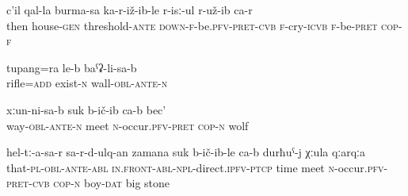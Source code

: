 \begin{exe} 
	\ex	\label{Then she sat down at the entrance of the house and was crying}
	\gll	c'il	qal-la	burma-sa	ka-r-iž-ib-le	r-isː-ul	r-už-ib ca-r\\
		then	house-\textsc{gen}	threshold-\textsc{ante}	\textsc{down}-\textsc{f}-be.\textsc{pfv}-\textsc{pret}-\textsc{cvb}	\textsc{f}-cry-\textsc{icvb}	\textsc{f}-be-\textsc{pret} \textsc{cop-f}\\
	\glt	{}
	
	
	\ex	\label{There is also a rifle (hanging) on the wall}
	\gll	tupang=ra	le-b	baˁʡ-li-sa-b \\
		rifle=\textsc{add}	exist-\textsc{n}	wall-\textsc{obl}-\textsc{ante}-\textsc{n}\\
	\glt	{}
	
	\ex	\label{On the way she met a wolf}
	\gll	xːun-ni-sa-b	suk	b-ič-ib ca-b	bec' \\
		way-\textsc{obl}-\textsc{ante}-\textsc{n}	meet	\textsc{n}-occur.\textsc{pfv}-\textsc{pret} \textsc{cop-n}	wolf\\
	\glt	{}
	
	\ex	\label{When they ran away from them, the boy saw a large stone}
	\gll	hel-tː-a-sa-r	sa-r-d-ulq-an	zamana	suk	b-ič-ib-le ca-b	durħuˁ-j	χːula	qːarqːa\\
		that-\textsc{pl}-\textsc{obl}-\textsc{ante}-\textsc{abl}	\textsc{in.front-abl}-\textsc{npl}-direct.\textsc{ipfv}-\textsc{ptcp}	time	meet	\textsc{n}-occur.\textsc{pfv}-\textsc{pret}-\textsc{cvb} \textsc{cop-n}	boy-\textsc{dat}	big	stone\\
	\glt	{}
\end{exe}

